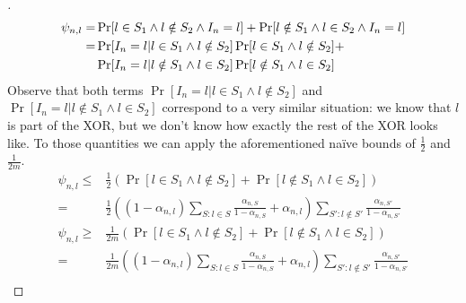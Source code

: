 \begin{proof}[]
  \begin{align}
    \psi_{n, l} =& \Pr[l \in S_1 \wedge l \notin S_2 \wedge I_n = l] + \Pr[l
        \notin S_1 \wedge l \in S_2 \wedge I_n = l] \\
    =& \Pr[I_n = l | l \in S_1 \wedge l \notin S_2] \Pr[l \in S_1 \wedge l
        \notin S_2] + \notag\\
    & \Pr[I_n = l | l \notin S_1 \wedge l \in S_2] \Pr[l \notin S_1 \wedge l
        \in S_2]
  \end{align}
  Observe that both terms $\Pr[I_n = l | l \in S_1 \wedge l \notin S_2]$ and
  $\Pr[I_n = l | l \notin S_1 \wedge l \in S_2]$ correspond to a very similar
  situation: we know that $l$ is part of the XOR, but we don't know how exactly
  the rest of the XOR looks like. To those quantities we can apply the
  aforementioned naïve bounds of $\frac{1}{2}$ and $\frac{1}{2m}$.
  \begin{align}
    \psi_{n, l} \leq& \frac{1}{2} (\Pr[l \in S_1 \wedge l \notin S_2] + \Pr[l
        \notin S_1 \wedge l \in S_2]) \\
      =& \frac{1}{2}((1 - \alpha_{n, l}) \sum_{S: l \in S} \frac{\alpha_{n,
          S}}{1 - \alpha_{n, S}} + \alpha_{n, l}) \sum_{S': l \notin S'}
          \frac{\alpha_{n, S'}}{1 - \alpha_{n, S'}} \\
    \psi_{n, l} \geq& \frac{1}{2m} (\Pr[l \in S_1 \wedge l \notin S_2] + \Pr[l
        \notin S_1 \wedge l \in S_2]) \\
      =& \frac{1}{2m}((1 - \alpha_{n, l}) \sum_{S: l \in S} \frac{\alpha_{n,
          S}}{1 - \alpha_{n, S}} + \alpha_{n, l}) \sum_{S': l \notin S'}
          \frac{\alpha_{n, S'}}{1 - \alpha_{n, S'}} \\
  \end{align}
\end{proof}

